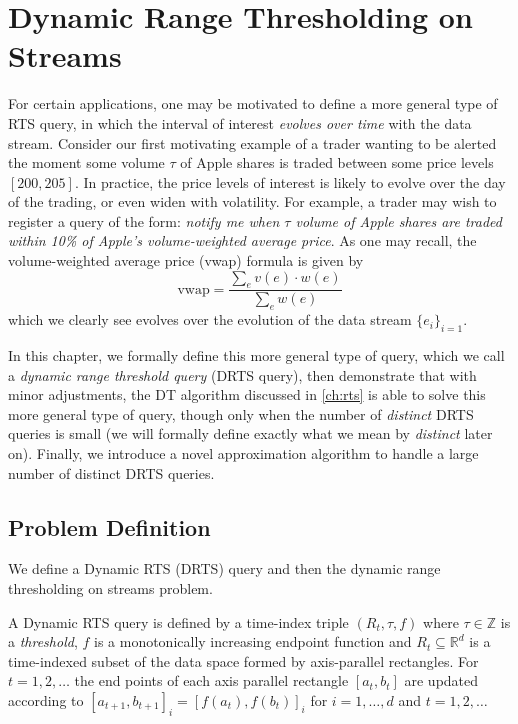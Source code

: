 \clearpage

\def\chaptertitle{Dynamic Range Thresholding on Streams}

\lhead{\emph{\chaptertitle}}

\chapter{\chaptertitle}
\label{ch:drts}

For certain applications, one may be motivated to define a more general type of RTS query, in which the interval of interest \textit{evolves over time} with the data stream. Consider our first motivating example of a trader wanting to be alerted the moment some volume $\tau$ of Apple shares is traded between some price levels $[200, 205]$. In practice, the price levels of interest is likely to evolve over the day of the trading, or even widen with volatility. For example, a trader may wish to register a query of the form: \textit{notify me when $\tau$ volume of Apple shares are traded within 10\% of Apple's volume-weighted average price}. As one may recall, the volume-weighted average price (vwap) formula is given by 
$$\text{vwap} = \frac{\sum_{e} v(e) \cdot w(e)}{\sum_{e}w(e)}$$
which we clearly see evolves over the evolution of the data stream $\{e_i\}_{i=1}$.

In this chapter, we formally define this more general type of query, which we call a \textit{dynamic range threshold query} (DRTS query), then demonstrate that with minor adjustments, the DT algorithm discussed in \cref{ch:rts} is able to solve this more general type of query, though only when the number of \textit{distinct} DRTS queries is small (we will formally define exactly what we mean by \textit{distinct} later on). Finally, we introduce a novel approximation algorithm to handle a large number of distinct DRTS queries. 


\section{Problem Definition}
\label{sec:drts-problem-definition}

We define a Dynamic RTS (DRTS) query and then the dynamic range thresholding on streams problem.

\begin{definition} A Dynamic RTS query is defined by a time-index triple $(R_t, \tau, f)$ where $\tau\in\mathbb{Z}$ is a \textit{threshold}, $f$ is a monotonically increasing  endpoint function and $R_t\subseteq \mathbb{R}^d$ is a time-indexed subset of the data space formed by axis-parallel rectangles. For $t =1,2,\dots$ the end points of each axis parallel rectangle $[a_t, b_t]$ are updated according to $[a_{t+1}, b_{t+1}]_i = [f(a_t), f(b_t)]_i$ for $i=1,\dots,d$ and $t=1,2,\dots$
\end{definition}


